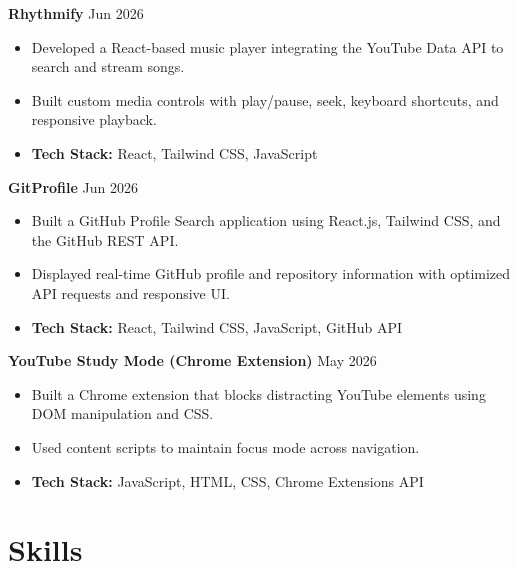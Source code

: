 \documentclass[11pt,a4paper]{article}
\begin{document}
\vspace{4pt}

\textbf{Rhythmify} \hfill Jun 2026

\begin{itemize}[leftmargin=*]
\item Developed a React-based music player integrating the YouTube Data API to search and stream songs.
\item Built custom media controls with play/pause, seek, keyboard shortcuts, and responsive playback.
\item \textbf{Tech Stack:} React, Tailwind CSS, JavaScript
\end{itemize}

\vspace{4pt}

\textbf{GitProfile} \hfill Jun 2026

\begin{itemize}[leftmargin=*]
\item Built a GitHub Profile Search application using React.js, Tailwind CSS, and the GitHub REST API.
\item Displayed real-time GitHub profile and repository information with optimized API requests and responsive UI.
\item \textbf{Tech Stack:} React, Tailwind CSS, JavaScript, GitHub API
\end{itemize}

\vspace{4pt}

\textbf{YouTube Study Mode (Chrome Extension)} \hfill May 2026

\begin{itemize}[leftmargin=*]
\item Built a Chrome extension that blocks distracting YouTube elements using DOM manipulation and CSS.
\item Used content scripts to maintain focus mode across navigation.
\item \textbf{Tech Stack:} JavaScript, HTML, CSS, Chrome Extensions API
\end{itemize}


\section*{Skills}
\end{document}
